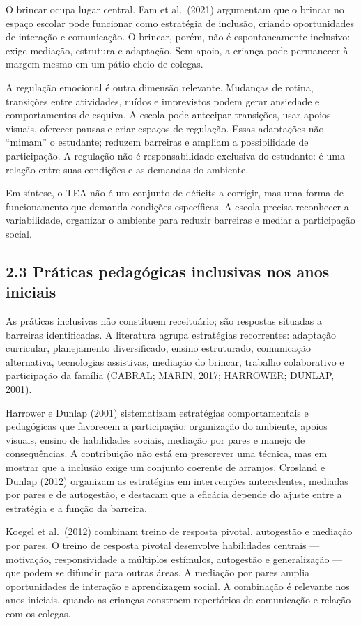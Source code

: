 O brincar ocupa lugar central. Fam et al.~(2021) argumentam que o
brincar no espaço escolar pode funcionar como estratégia de inclusão,
criando oportunidades de interação e comunicação. O brincar, porém, não
é espontaneamente inclusivo: exige mediação, estrutura e adaptação. Sem
apoio, a criança pode permanecer à margem mesmo em um pátio cheio de
colegas.

A regulação emocional é outra dimensão relevante. Mudanças de rotina,
transições entre atividades, ruídos e imprevistos podem gerar ansiedade
e comportamentos de esquiva. A escola pode antecipar transições, usar
apoios visuais, oferecer pausas e criar espaços de regulação. Essas
adaptações não ``mimam'' o estudante; reduzem barreiras e ampliam a
possibilidade de participação. A regulação não é responsabilidade
exclusiva do estudante: é uma relação entre suas condições e as demandas
do ambiente.

Em síntese, o TEA não é um conjunto de déficits a corrigir, mas uma
forma de funcionamento que demanda condições específicas. A escola
precisa reconhecer a variabilidade, organizar o ambiente para reduzir
barreiras e mediar a participação social.

\subsection{2.3 Práticas pedagógicas inclusivas nos anos
iniciais}\label{pruxe1ticas-pedaguxf3gicas-inclusivas-nos-anos-iniciais}

As práticas inclusivas não constituem receituário; são respostas
situadas a barreiras identificadas. A literatura agrupa estratégias
recorrentes: adaptação curricular, planejamento diversificado, ensino
estruturado, comunicação alternativa, tecnologias assistivas, mediação
do brincar, trabalho colaborativo e participação da família (CABRAL;
MARIN, 2017; HARROWER; DUNLAP, 2001).

Harrower e Dunlap (2001) sistematizam estratégias comportamentais e
pedagógicas que favorecem a participação: organização do ambiente,
apoios visuais, ensino de habilidades sociais, mediação por pares e
manejo de consequências. A contribuição não está em prescrever uma
técnica, mas em mostrar que a inclusão exige um conjunto coerente de
arranjos. Crosland e Dunlap (2012) organizam as estratégias em
intervenções antecedentes, mediadas por pares e de autogestão, e
destacam que a eficácia depende do ajuste entre a estratégia e a função
da barreira.

Koegel et al.~(2012) combinam treino de resposta pivotal, autogestão e
mediação por pares. O treino de resposta pivotal desenvolve habilidades
centrais --- motivação, responsividade a múltiplos estímulos, autogestão
e generalização --- que podem se difundir para outras áreas. A mediação
por pares amplia oportunidades de interação e aprendizagem social. A
combinação é relevante nos anos iniciais, quando as crianças constroem
repertórios de comunicação e relação com os colegas.

